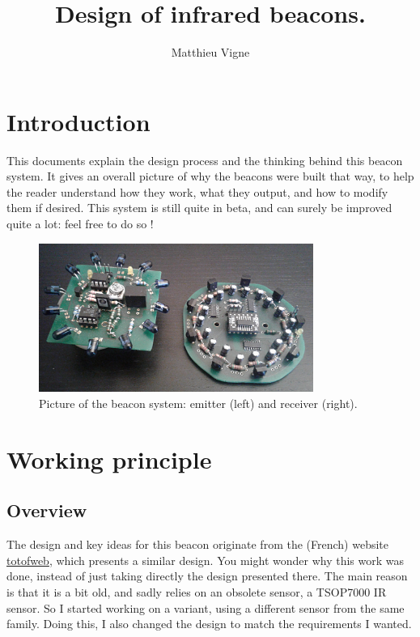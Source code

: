 \documentclass[a4paper,11pt]{article}
\title{Design of infrared beacons.}
\author{Matthieu Vigne}
\begin{document}
\maketitle
\tableofcontents
\section{Introduction}

This documents explain the design process and the thinking behind this beacon system. It gives an overall picture of why the beacons were built that way, to help the reader understand how they work, what they output, and how to modify them if desired. This system is still quite in beta, and can surely be improved quite a lot: feel free to do so !

\begin{figure}[h]
  \centering
  \includegraphics[width=0.8\textwidth]{Figures/Beacons.jpg}
  \caption{Picture of the beacon system: emitter (left) and receiver (right).}
\end{figure}

\section{Working principle}

\subsection{Overview}

The design and key ideas for this beacon originate from the (French) website \href{http://www.totofweb.net/robots-projet-67.html}{totofweb}, which presents a similar design. You might wonder why this work was done, instead of just taking directly the design presented there. The main reason is that it is a bit old, and sadly relies on an obsolete sensor, a TSOP7000 IR sensor. So I started working on a variant, using a different sensor from the same family. Doing this, I also changed the design to match the requirements I wanted.
\end{document}
